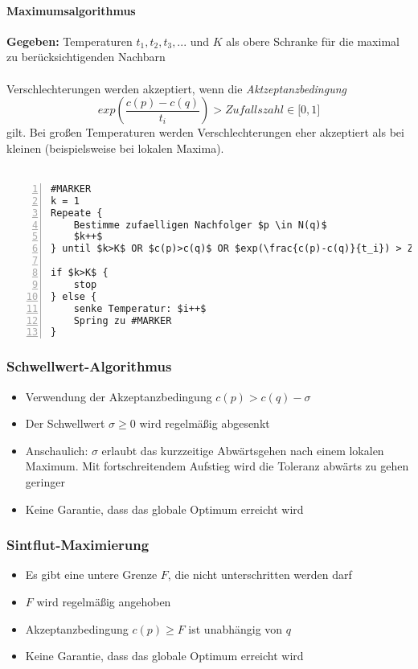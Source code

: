 \paragraph{Maximumsalgorithmus}
\textbf{Gegeben:} Temperaturen \(t_1,t_2,t_3,...\) und \(K\) als obere Schranke für die maximal zu berücksichtigenden Nachbarn
\\\\
Verschlechterungen werden akzeptiert, wenn die \textit{Aktzeptanzbedingung}
\[exp(\frac{c(p)-c(q)}{t_i}) > Zufallszahl \in \lbrack 0,1 \rbrack\]
gilt. Bei großen Temperaturen werden Verschlechterungen eher akzeptiert als bei kleinen (beispielsweise bei lokalen Maxima).
\\\\
\begin{minipage}{\textwidth}
\begin{lstlisting}[frame=single,numbers=left,mathescape]
#MARKER
k = 1
Repeate {
	Bestimme zufaelligen Nachfolger $p \in N(q)$
	$k++$
} until $k>K$ OR $c(p)>c(q)$ OR $exp(\frac{c(p)-c(q)}{t_i}) > Zufallszahl \in \lbrack 0,1 \rbrack$

if $k>K$ {
	stop
} else {
	senke Temperatur: $i++$
	Spring zu #MARKER
}
\end{lstlisting}
\end{minipage}

\subsubsection{Schwellwert-Algorithmus}
\begin{itemize}
	\item Verwendung der Akzeptanzbedingung \(c(p) > c(q) - \sigma\)
	\item Der Schwellwert \(\sigma \geq 0\) wird regelmäßig abgesenkt
	\item Anschaulich: \(\sigma\) erlaubt das kurzzeitige Abwärtsgehen nach einem lokalen Maximum. Mit fortschreitendem Aufstieg wird die Toleranz abwärts zu gehen geringer
	\item Keine Garantie, dass das globale Optimum erreicht wird
\end{itemize}

\subsubsection{Sintflut-Maximierung}
\begin{itemize}
	\item Es gibt eine untere Grenze \(F\), die nicht unterschritten werden darf
	\item \(F\) wird regelmäßig angehoben
	\item Akzeptanzbedingung \(c(p) \geq F\) ist unabhängig von \(q\)
	\item Keine Garantie, dass das globale Optimum erreicht wird
\end{itemize}

